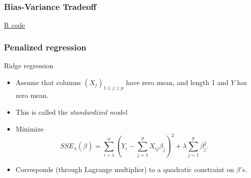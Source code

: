 \documentclass[handout]{beamer}
\newcommand{\B}[1]{\beta_{#1}}
\begin{document}


   \begin{frame}
   \frametitle{Bias-Variance Tradeoff}
   \begin{center}
   \end{center}
   \href{http://www.stanford.edu/class/stats191/selection.html#bias-variance-tradeoff}{R code}
   \end{frame}


   \begin{frame} \frametitle{Penalized regression}

   \begin{block}
   {Ridge regression}
       \begin{itemize}

       \item Assume that columns $(X_j)_{1 \leq j \leq p}$ have zero mean, and length 1 and $Y$ has zero mean.

       \item This is called the {\em standardized model}.
       \item Minimize
   {\small
   $$
   SSE_{\lambda}(\B{}) = \sum_{i=1}^n \left(Y_i - \sum_{j=1}^{p} X_{ij} \B{j}\right)^2 + \lambda \sum_{j=1}^{p} \B{j}^2.$$}

   \item Corresponds (through Lagrange multiplier) to a quadratic constraint on $\B{}$'s.

       \end{itemize}

   \end{block}
   \end{frame}

\end{document}
